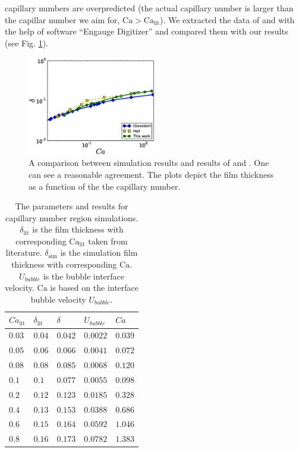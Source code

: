 \documentclass{CFD2011}
\newcommand{\Ca}{\mathrm{Ca}}
\begin{document}
capillary numbers are overpredicted (the actual capillary number is larger than the capillar number
we aim for, $\Ca>\Ca_{\mathrm{lit}}$). We
extracted
the data of 
\citet{giavedoni-numerical} and \citet{heil-bretherton} with the help of software ``Engauge
Digitizer'' and compared them with our results (see 
Fig. \ref{fig:capillary:comparison}).
\begin{figure}
\includegraphics[width=0.5\textwidth]{Figures/capillaries_comparison.eps}
\caption{A comparison between simulation results and results of
\citet{giavedoni-numerical} and \citet{heil-bretherton}. One can see a
reasonable agreement. The plots depict the film thickness as a function of the
the capillary number.\label{fig:capillary:comparison}}
\end{figure}

\begin{table}
\begin{tabularx}{0.5\textwidth}{|X|X|X|X|X|}
\hline
$Ca_{\mathrm{lit}}$&$\delta_{\mathrm{lit}}$&$\delta$&$U_{bubble}$&$Ca$\\
\hline
$0.03$&$0.04$&$0.042$&$0.0022$&$0.039$\\
\hline
$0.05$&$0.06$&$0.066$&$0.0041$&$0.072$\\
\hline
$0.08$&$0.08$&$0.085$&$0.0068$&$0.120$\\
\hline
$0.1$&$0.1$&$0.077$&$0.0055$&$0.098$\\
\hline
$0.2$&$0.12$&$0.123$&$0.0185$&$0.328$\\
\hline
$0.4$&$0.13$&$0.153$&$0.0388$&$0.686$\\
\hline
$0.6$&$0.15$&$0.164$&$0.0592$&$1.046$\\
\hline
$0.8$&$0.16$&$0.173$&$0.0782$&$1.383$\\
\hline
\end{tabularx}
\caption{The parameters and results for capillary number region simulations.
$\delta_{\mathrm{lit}}$ is the film thickness with corresponding $\Ca_{\mathrm{lit}}$ taken from
literature. $\delta_{\mathrm{sim}}$ is the simulation film thickness with corresponding $\Ca$.
$U_{bubble}$ is the bubble interface velocity. $\Ca$ is based on the interface bubble velocity
$U_{bubble}$.
\label{table:parameters:capillary:number}}
\end{table}
\end{document}
